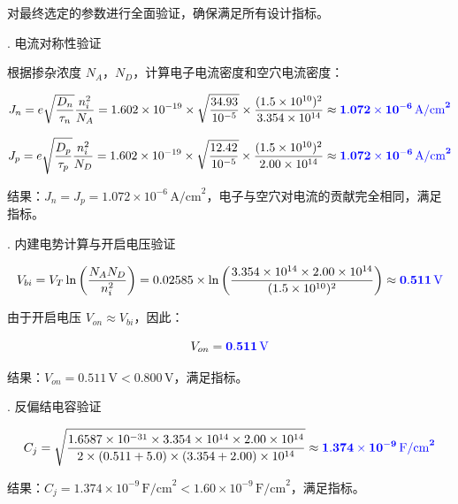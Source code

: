\documentclass[12pt,a4paper]{article}
\begin{document}
对最终选定的参数进行全面验证，确保满足所有设计指标。

{. 电流对称性验证}

根据掺杂浓度 $N_A，N_D $，计算电子电流密度和空穴电流密度：

\begin{equation}
J_n = e \sqrt{\frac{D_n}{\tau_n}} \frac{n_i^2}{N_A} = 1.602 \times 10^{-19} \times \sqrt{\frac{34.93}{10^{-5}}} \times \frac{(1.5 \times 10^{10})^2}{3.354 \times 10^{14}} \approx \textcolor{blue}{\mathbf{1.072 \times 10^{-6}\,\text{A/cm}^2}}
\end{equation}

\begin{equation}
J_p = e \sqrt{\frac{D_p}{\tau_p}} \frac{n_i^2}{N_D} = 1.602 \times 10^{-19} \times \sqrt{\frac{12.42}{10^{-5}}} \times \frac{(1.5 \times 10^{10})^2}{2.00 \times 10^{14}} \approx \textcolor{blue}{\mathbf{1.072 \times 10^{-6}\,\text{A/cm}^2}}
\end{equation}

结果：$J_n = J_p = 1.072 \times 10^{-6}\,\text{A/cm}^2$，电子与空穴对电流的贡献完全相同，满足指标。

{. 内建电势计算与开启电压验证}

\begin{equation}
V_{bi} = V_T \ln \left( \frac{N_A N_D}{n_i^2} \right) = 0.02585 \times \ln \left( \frac{3.354 \times 10^{14} \times 2.00 \times 10^{14}}{(1.5 \times 10^{10})^2} \right) \approx \textcolor{blue}{\mathbf{0.511\,\text{V}}}
\end{equation}

由于开启电压 $V_{on} \approx V_{bi}$，因此：

\begin{equation}
V_{on} = \textcolor{blue}{\mathbf{0.511\,\text{V}}}
\end{equation}

结果：$V_{on} = 0.511\,\text{V} < 0.800\,\text{V}$，满足指标。

\clearpage
{. 反偏结电容验证}

\begin{equation}
C_j = \sqrt{\frac{1.6587 \times 10^{-31} \times 3.354 \times 10^{14} \times 2.00 \times 10^{14}}{2 \times (0.511 + 5.0) \times (3.354 + 2.00) \times 10^{14}}} \approx \textcolor{blue}{\mathbf{1.374 \times 10^{-9}\,\text{F/cm}^2}}
\end{equation}

结果：$C_j = 1.374 \times 10^{-9}\,\text{F/cm}^2 < 1.60 \times 10^{-9}\,\text{F/cm}^2$，满足指标。
\end{document}
